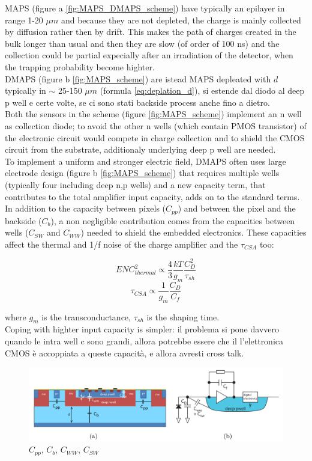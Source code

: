 \begin{titlepage}
MAPS (figure a \ref{fig:MAPS_DMAPS_scheme}) have typically an epilayer in range 
1-20 $\mu m$ and because they
are not depleted, the charge is mainly collected by diffusion rather then by drift.
This makes the path of charges created in the bulk longer than usual and then they are
slow (of order of 100 ns) and the collection could be partial expecially after
an irradiation of the detector, when the trapping probability become highter. \\
DMAPS (figure b \ref{fig:MAPS_scheme}) are istead MAPS depleated 
with $d$ typically in $\sim$ 25-150 $\mu m$ (formula \ref{eq:deplation_d}),
si estende dal diodo al deep p well e certe volte, se ci sono stati backside process 
anche fino a dietro.\\
Both the sensors in the scheme  (figure \ref{fig:MAPS_scheme}) implement an n well as 
collection diode; to avoid the other n wells (which contain PMOS transistor) of the electronic circuit would compete 
in charge collection and to shield the CMOS circuit from the substrate, additionaly 
underlying deep p well are needed.\\
To implement a uniform and stronger electric field, DMAPS often uses large electrode
design (figure b \ref{fig:MAPS_scheme}) that requires multiple wells 
(typically four including deep n,p wells) and a new capacity term, that contributes to the 
total amplifier input capacity, adds on to the standard terms.
In addition to the capacity between pixels ($C_{pp}$) and
between the pixel and the backside ($C_{b}$), a non negligible contribution comes
from the capacities between wells ($C_{SW}$ and $C_{WW}$) needed to shield the
embedded electronics. These capacities affect the thermal and 1/f noise of the charge amplifier and
the $ \tau_{CSA}$ too:
\begin{multicols}{2}
   \begin{equation}
      ENC^2 _ {thermal} \propto \frac{4}{3}\frac{kT}{g_m}\frac{C_D ^2}{\tau_{sh}}
   \end{equation}\break
   \begin{equation}
     \tau_{CSA} \propto \frac{1}{g_m}\frac{C_D}{C_f}
   \end{equation}
\end{multicols}
where $g_m$ is the transconductance, $\tau_{sh}$ is the shaping time. \\
Coping with highter input capacity is simpler: il problema si pone davvero quando 
le intra well c sono grandi, allora potrebbe essere che il l'elettronica CMOS è 
accoppiata a queste capacità, e allora avresti cross talk.\\
\begin{figure}[h!]
   \centering\includegraphics[width=12cm]{figures/DMAPS_capacity.png}
   \caption{$C_{pp}$, $C_{b}$, $C_{WW}$, $C_{SW}$}
   \label{fig:DMAPS_capacity}
\end{figure}


\end{titlepage}
